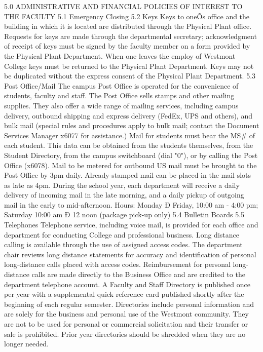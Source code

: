 \documentclass[letterpaper, 11pt]{article}
\begin{document}
5.0 ADMINISTRATIVE AND FINANCIAL POLICIES OF INTEREST TO THE FACULTY
5.1 Emergency Closing
5.2 Keys
   Keys to oneÕs office and the building in which it is located are distributed through the Physical Plant office.  Requests for keys are made through the departmental secretary; acknowledgment of receipt of keys must be signed by the faculty member on a form provided by the Physical Plant Department.  When one leaves the employ of Westmont College keys must be returned to the Physical Plant Department.  Keys may not be duplicated without the express consent of the Physical Plant Department.
5.3 Post Office/Mail
   The campus Post Office is operated for the convenience of students, faculty and staff. The Post Office sells stamps and other mailing supplies. They also offer a wide range of mailing services, including campus delivery, outbound shipping and express delivery (FedEx, UPS and others), and bulk mail (special rules and procedures apply to bulk mail; contact the Document Services Manager x6077 for assistance.)
   Mail for students must bear the MS\# of each student. This data can be obtained from the students themselves, from the Student Directory, from the campus switchboard (dial "0"), or by calling the Post Office (x6078).
   Mail to be metered for outbound US mail must be brought to the Post Office by 3pm daily. Already-stamped mail can be placed in the mail slots as late as 4pm. During the school year, each department will receive a daily delivery of incoming mail in the late morning, and a daily pickup of outgoing mail in the early to mid-afternoon.
   Hours:  Monday Ð Friday, 10:00 am - 4:00 pm; Saturday 10:00 am Ð 12 noon (package pick-up only)
5.4 Bulletin Boards
5.5 Telephones
   Telephone service, including voice mail, is provided for each office and department for conducting College and professional business.  Long distance calling is available through the use of assigned access codes.  The department chair reviews long distance statements for accuracy and identification of personal long-distance calls placed with access codes.  Reimbursement for personal long-distance calls are made directly to the Business Office and are credited to the department telephone account.  A Faculty and Staff Directory is published once per year with a supplemental quick reference card published shortly after the beginning of each regular semester.  Directories include personal information and are solely for the business and personal use of the Westmont community.  They are not to be used for personal or commercial solicitation and their transfer or sale is prohibited.  Prior year directories should be shredded when they are no longer needed.
\end{document}
